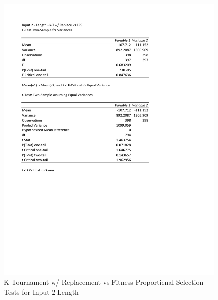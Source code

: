 \documentclass[times]{article}
\begin{document}
	\begin{figure}
		\caption{K-Tournament w/ Replacement vs Fitness Proportional Selection Tests for Input 2 Length}
		\label{fig:2parent1}
		\includegraphics[width=\textwidth]{./t_test/2_parent1.pdf}
	\end{figure}
\end{document}
